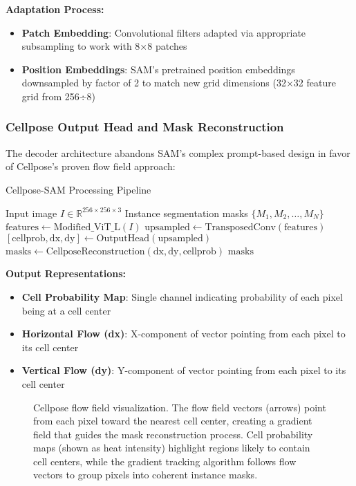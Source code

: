 \documentclass[../cellseek_paper.tex]{subfiles}
\begin{document}
\textbf{Adaptation Process:}
\begin{itemize}
  \item \textbf{Patch Embedding}: Convolutional filters adapted via appropriate subsampling to work with 8×8 patches
  \item \textbf{Position Embeddings}: SAM's pretrained position embeddings downsampled by factor of 2 to match new grid dimensions (32×32 feature grid from 256÷8)
\end{itemize}

\subsubsection{Cellpose Output Head and Mask Reconstruction}

The decoder architecture abandons SAM's complex prompt-based design in favor of Cellpose's proven flow field approach:

\begin{algorithm}[H]
  \caption{Cellpose-SAM Processing Pipeline}
  \begin{algorithmic}[1]
    \REQUIRE Input image $I \in \mathbb{R}^{256 \times 256 \times 3}$
    \ENSURE Instance segmentation masks $\{M_1, M_2, \ldots, M_N\}$
    \STATE $\text{features} \leftarrow \text{Modified\_ViT\_L}(I)$ 
    \STATE $\text{upsampled} \leftarrow \text{TransposedConv}(\text{features})$ 
    \STATE $[\text{cellprob}, \text{dx}, \text{dy}] \leftarrow \text{OutputHead}(\text{upsampled})$ 
    \STATE $\text{masks} \leftarrow \text{CellposeReconstruction}(\text{dx}, \text{dy}, \text{cellprob})$ 
    \RETURN $\text{masks}$
  \end{algorithmic}
\end{algorithm}

\textbf{Output Representations:}
\begin{itemize}
  \item \textbf{Cell Probability Map}: Single channel indicating probability of each pixel being at a cell center
  \item \textbf{Horizontal Flow (dx)}: X-component of vector pointing from each pixel to its cell center
  \item \textbf{Vertical Flow (dy)}: Y-component of vector pointing from each pixel to its cell center
\end{itemize}

\begin{figure}[H]
  \centering
  
  \caption{Cellpose flow field visualization. The flow field vectors (arrows) point from each pixel toward the nearest cell center, creating a gradient field that guides the mask reconstruction process. Cell probability maps (shown as heat intensity) highlight regions likely to contain cell centers, while the gradient tracking algorithm follows flow vectors to group pixels into coherent instance masks.}
  \label{fig:flow_field}
\end{figure}
\end{document}
